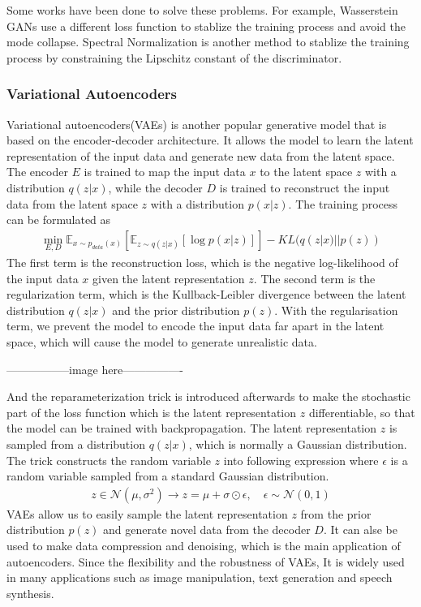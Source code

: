 \documentclass[12pt,DIV14,BCOR12mm,a4paper,footinclude=false,headinclude,parskip=half-,twoside,openright,cleardoublepage=empty,toc=index,bibliography=totoc,listof=totoc]{scrreprt}
\numberwithin{equation}{chapter}
\begin{document}
Some works have been done to solve these problems. For example, Wasserstein GANs\cite{arjovsky2017wasserstein} use a different loss function to stablize the training process 
and avoid the mode collapse. Spectral Normalization\cite{miyato2018spectral} is another method to stablize the training process by 
constraining the Lipschitz constant of the discriminator.
\subsubsection{Variational Autoencoders}
Variational autoencoders(VAEs)\cite{kingma2022autoencoding} is another popular generative model that is based on the encoder-decoder architecture. 
It allows the model to learn the latent representation of the input data and generate new data from the latent space. 
The encoder $E$ is trained to map the input data $x$ to the latent space $z$ with a distribution $q(z|x)$,
while the decoder $D$ is trained to reconstruct the input data from the latent space $z$ with a distribution $p(x|z)$. The training process can be formulated as
\begin{align}
  \min_{E,D} \mathbb{E}_{x\sim p_{data}(x)}[\mathbb{E}_{z\sim q(z|x)}[\log p(x|z)]] - KL(q(z|x)||p(z))
\end{align}
The first term is the reconstruction loss, which is the negative log-likelihood of the input data $x$ given the latent representation $z$.
The second term is the regularization term, which is the Kullback-Leibler divergence between the latent distribution $q(z|x)$ and the prior distribution $p(z)$.
With the regularisation term, we prevent the model to encode the input data far apart in the latent space, which will cause the model to generate unrealistic data.

-----------------image here----------------

And the reparameterization trick\cite{kingma2015variational} is introduced afterwards to make the stochastic part of the loss function 
which is the latent representation $z$ differentiable, so that the model can be trained with backpropagation. 
The latent representation $z$ is sampled from a distribution $q(z|x)$, which is normally a Gaussian distribution.
The trick constructs the random variable $z$ into following expression where $\epsilon$ is a random variable sampled from a standard Gaussian distribution.
\begin{align}
  z \in \mathcal{N} (\mu, \sigma^{2}) \longrightarrow z = \mu + \sigma \odot \epsilon, \quad \epsilon \sim \mathcal{N} (0, 1)
\end{align}
VAEs allow us to easily sample the latent representation $z$ from the prior distribution $p(z)$ and generate novel data from the decoder $D$.
It can alse be used to make data compression and denoising, which is the main application of autoencoders. Since the flexibility and the robustness of VAEs,
It is widely used in many applications such as image manipulation, text generation and speech synthesis.
\end{document}
